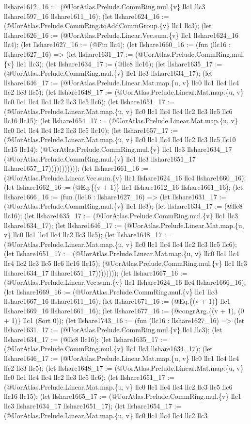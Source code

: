 \documentclass[11pt]{article}
\begin{document}
llshare1612\_16 := (@UorAtlas.Prelude.CommRing.mul.\{v\} llc1 llc3 llshare1597\_16 llshare1611\_16); (let llshare1624\_16 := (@UorAtlas.Prelude.CommRing.toAddCommGroup.\{v\} llc1 llc3); (let llshare1626\_16 := (@UorAtlas.Prelude.Linear.Vec.sum.\{v\} llc1 llshare1624\_16 llc4); (let llshare1627\_16 := (@Fin llc4); (let llshare1660\_16 := (fun (llc16 : llshare1627\_16) => (let llshare1631\_17 := (@UorAtlas.Prelude.CommRing.mul.\{v\} llc1 llc3); (let llshare1634\_17 := (@llc8 llc16); (let llshare1635\_17 := (@UorAtlas.Prelude.CommRing.mul.\{v\} llc1 llc3 llshare1634\_17); (let llshare1646\_17 := (@UorAtlas.Prelude.Linear.Mat.map.\{u, v\} llc0 llc1 llc4 llc4 llc2 llc3 llc5); (let llshare1648\_17 := (@UorAtlas.Prelude.Linear.Mat.map.\{u, v\} llc0 llc1 llc4 llc4 llc2 llc3 llc5 llc6); (let llshare1651\_17 := (@UorAtlas.Prelude.Linear.Mat.map.\{u, v\} llc0 llc1 llc4 llc4 llc2 llc3 llc5 llc6 llc16 llc15); (let llshare1654\_17 := (@UorAtlas.Prelude.Linear.Mat.map.\{u, v\} llc0 llc1 llc4 llc4 llc2 llc3 llc5 llc10); (let llshare1657\_17 := (@UorAtlas.Prelude.Linear.Mat.map.\{u, v\} llc0 llc1 llc4 llc4 llc2 llc3 llc5 llc10 llc15 llc14); (@UorAtlas.Prelude.CommRing.mul.\{v\} llc1 llc3 llshare1634\_17 (@UorAtlas.Prelude.CommRing.mul.\{v\} llc1 llc3 llshare1651\_17 llshare1657\_17))))))))))); (let llshare1661\_16 := (@UorAtlas.Prelude.Linear.Vec.sum.\{v\} llc1 llshare1624\_16 llc4 llshare1660\_16); (let llshare1662\_16 := (@Eq.\{(v + 1)\} llc1 llshare1612\_16 llshare1661\_16); (let llshare1666\_16 := (fun (llc16 : llshare1627\_16) => (let llshare1631\_17 := (@UorAtlas.Prelude.CommRing.mul.\{v\} llc1 llc3); (let llshare1634\_17 := (@llc8 llc16); (let llshare1635\_17 := (@UorAtlas.Prelude.CommRing.mul.\{v\} llc1 llc3 llshare1634\_17); (let llshare1646\_17 := (@UorAtlas.Prelude.Linear.Mat.map.\{u, v\} llc0 llc1 llc4 llc4 llc2 llc3 llc5); (let llshare1648\_17 := (@UorAtlas.Prelude.Linear.Mat.map.\{u, v\} llc0 llc1 llc4 llc4 llc2 llc3 llc5 llc6); (let llshare1651\_17 := (@UorAtlas.Prelude.Linear.Mat.map.\{u, v\} llc0 llc1 llc4 llc4 llc2 llc3 llc5 llc6 llc16 llc15); (@UorAtlas.Prelude.CommRing.mul.\{v\} llc1 llc3 llshare1634\_17 llshare1651\_17)))))))); (let llshare1667\_16 := (@UorAtlas.Prelude.Linear.Vec.sum.\{v\} llc1 llshare1624\_16 llc4 llshare1666\_16); (let llshare1669\_16 := (@UorAtlas.Prelude.CommRing.mul.\{v\} llc1 llc3 llshare1667\_16 llshare1611\_16); (let llshare1671\_16 := (@Eq.\{(v + 1)\} llc1 llshare1669\_16 llshare1661\_16); (let llshare1677\_16 := (@congrArg.\{(v + 1), (0 + 1)\} llc1 (Sort 0)); (let llshare1743\_16 := (fun (llc16 : llshare1627\_16) => (let llshare1631\_17 := (@UorAtlas.Prelude.CommRing.mul.\{v\} llc1 llc3); (let llshare1634\_17 := (@llc8 llc16); (let llshare1635\_17 := (@UorAtlas.Prelude.CommRing.mul.\{v\} llc1 llc3 llshare1634\_17); (let llshare1646\_17 := (@UorAtlas.Prelude.Linear.Mat.map.\{u, v\} llc0 llc1 llc4 llc4 llc2 llc3 llc5); (let llshare1648\_17 := (@UorAtlas.Prelude.Linear.Mat.map.\{u, v\} llc0 llc1 llc4 llc4 llc2 llc3 llc5 llc6); (let llshare1651\_17 := (@UorAtlas.Prelude.Linear.Mat.map.\{u, v\} llc0 llc1 llc4 llc4 llc2 llc3 llc5 llc6 llc16 llc15); (let llshare1665\_17 := (@UorAtlas.Prelude.CommRing.mul.\{v\} llc1 llc3 llshare1634\_17 llshare1651\_17); (let llshare1654\_17 := (@UorAtlas.Prelude.Linear.Mat.map.\{u, v\} llc0 llc1 llc4 llc4 llc2 llc3 
\end{document}
